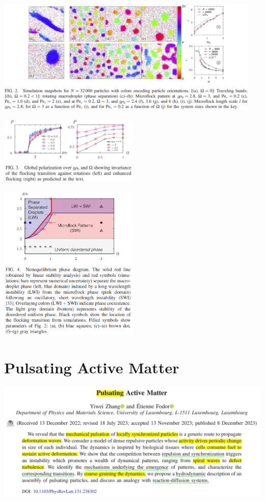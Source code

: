 \documentclass[10pt,aspectratio=43,mathserif,table]{beamer}
\begin{document}
\begin{frame}
    \centering
    \includegraphics[width=0.95\textwidth]{figs/p1_f2.png}
    \begin{multicols}{2}
        \includegraphics[width=0.5\textwidth]{figs/p1_f3.png}

        \includegraphics[width=0.5\textwidth]{figs/p1_f4.png}
    \end{multicols}
\end{frame}

\section{Pulsating Active Matter}

\begin{frame}
    \centering
    \includegraphics[width=\textwidth]{figs/title2.png}
\end{frame}
\end{document}
